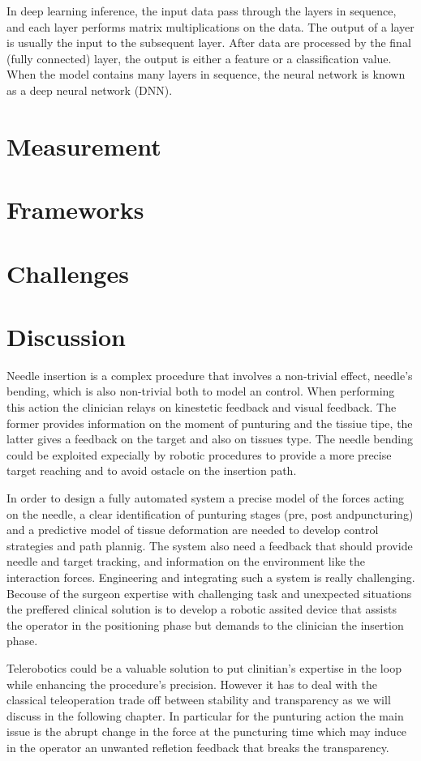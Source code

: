In deep learning inference, the input data pass through the layers in sequence, and each layer performs matrix multiplications on the data. The output of a layer is usually the input to the subsequent layer. After data are processed by the final (fully connected) layer, the output is either a feature or a classification value.
When the model contains many layers in sequence, the neural network is known as a deep neural network (DNN).




\section{Measurement}


\section{Frameworks}


\section{Challenges}

\section{Discussion}
Needle insertion is a complex procedure that involves a non-trivial effect, needle's bending, which is also non-trivial both to model an control.
When performing this action the clinician relays on kinestetic feedback and visual feedback. The former provides information on the moment of punturing and the tissiue tipe, the latter gives a feedback on the target and also on tissues type.
The needle bending could be exploited expecially by robotic procedures to provide a more precise target reaching and to avoid ostacle on the insertion path.

In order to design a fully automated system a precise model of the forces acting on the needle, a clear identification of punturing stages (pre, post andpuncturing) and a predictive model of tissue deformation are needed to develop control strategies and path plannig. The system also need a feedback that should provide needle and target tracking, and information on the environment like the interaction forces.
Engineering and integrating such a system is really challenging.
Becouse of the surgeon expertise with challenging task and unexpected situations the preffered clinical solution is to develop a robotic assited device that assists the operator in the positioning phase but demands to the clinician the insertion phase.

Telerobotics could be a valuable solution to put clinitian's expertise in the loop while enhancing the procedure's precision. However it has to deal with the classical teleoperation trade off between stability and transparency as we will discuss in the following chapter. In particular for the punturing action the main issue is the abrupt change in the force at the puncturing time which may induce in the operator an unwanted refletion feedback that breaks the transparency. 


\clearpage
\thispagestyle{empty}